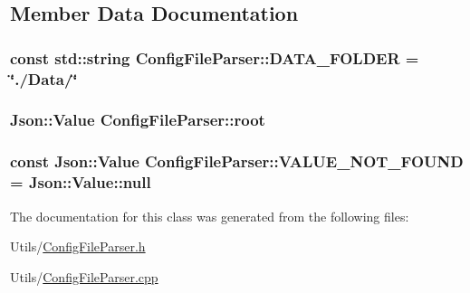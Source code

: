 \subsection{Member Data Documentation}
\hypertarget{classConfigFileParser_a03d130795beded6ace2b5d9b2e120216}{
\subsubsection[{D\-A\-T\-A\-\_\-\-F\-O\-L\-D\-E\-R}]{\setlength{\rightskip}{0pt plus 5cm}const std\-::string Config\-File\-Parser\-::\-D\-A\-T\-A\-\_\-\-F\-O\-L\-D\-E\-R = \char`\"{}./Data/\char`\"{}\hspace{0.3cm}{\ttfamily [static]}}}\label{classConfigFileParser_a03d130795beded6ace2b5d9b2e120216}
\hypertarget{classConfigFileParser_a61cfe04569f4b8864352068cf1a60475}{
\subsubsection[{root}]{\setlength{\rightskip}{0pt plus 5cm}Json\-::\-Value Config\-File\-Parser\-::root}}\label{classConfigFileParser_a61cfe04569f4b8864352068cf1a60475}
\hypertarget{classConfigFileParser_a3f5b477413c70e4364d68345ebec52a1}{
\subsubsection[{V\-A\-L\-U\-E\-\_\-\-N\-O\-T\-\_\-\-F\-O\-U\-N\-D}]{\setlength{\rightskip}{0pt plus 5cm}const Json\-::\-Value Config\-File\-Parser\-::\-V\-A\-L\-U\-E\-\_\-\-N\-O\-T\-\_\-\-F\-O\-U\-N\-D = Json\-::\-Value\-::null\hspace{0.3cm}{\ttfamily [static]}}}\label{classConfigFileParser_a3f5b477413c70e4364d68345ebec52a1}


The documentation for this class was generated from the following files\-:\begin{DoxyCompactItemize}
\item 
Utils/\hyperlink{ConfigFileParser_8h}{Config\-File\-Parser.\-h}\item 
Utils/\hyperlink{ConfigFileParser_8cpp}{Config\-File\-Parser.\-cpp}\end{DoxyCompactItemize}
